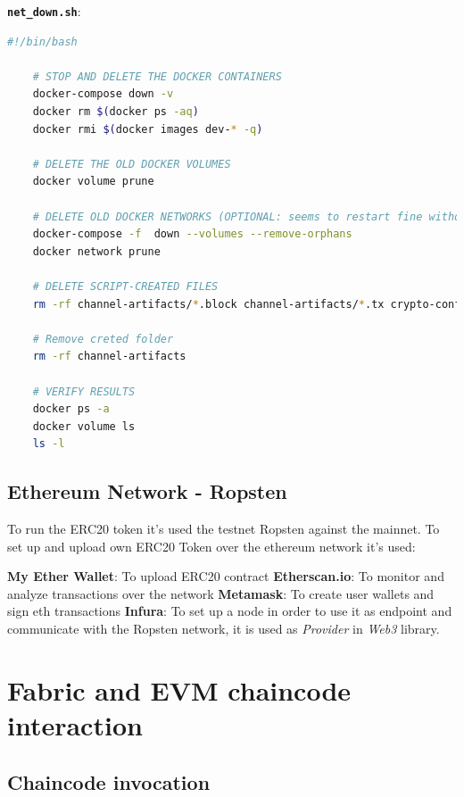 \bigskip

\textbf{\texttt{net\_down.sh}}:

\begin{lstlisting}[language=bash]
    #!/bin/bash

    # STOP AND DELETE THE DOCKER CONTAINERS
    docker-compose down -v
    docker rm $(docker ps -aq)
    docker rmi $(docker images dev-* -q)

    # DELETE THE OLD DOCKER VOLUMES
    docker volume prune

    # DELETE OLD DOCKER NETWORKS (OPTIONAL: seems to restart fine without)
    docker-compose -f  down --volumes --remove-orphans
    docker network prune

    # DELETE SCRIPT-CREATED FILES
    rm -rf channel-artifacts/*.block channel-artifacts/*.tx crypto-config

    # Remove creted folder
    rm -rf channel-artifacts

    # VERIFY RESULTS
    docker ps -a
    docker volume ls
    ls -l
\end{lstlisting}

\newpage
\subsection{Ethereum Network - Ropsten}

To run the ERC20 token it's used the testnet Ropsten against the mainnet. 
To set up and upload own ERC20 Token over the ethereum network it's used:

\begin{outline}
    \1 \textbf{My Ether Wallet}: To upload ERC20 contract 
    \1 \textbf{Etherscan.io}: To monitor and analyze transactions over the network
    \1 \textbf{Metamask}: To create user wallets and sign eth transactions
    \1 \textbf{Infura}: To set up a node in order to use it as endpoint and communicate with the Ropsten network,
    it is used as \textit{Provider} in \textit{Web3} library.  
\end{outline}

\section{Fabric and EVM chaincode interaction}

\subsection{Chaincode invocation}

